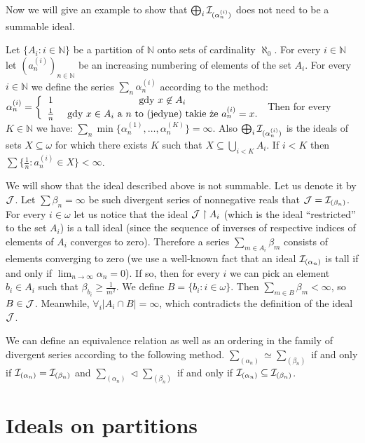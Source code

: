 \documentclass[12pt]{article}
\theoremstyle{plain}
\theoremstyle{definition}
\theoremstyle{remark}
\newcommand{\nnatural}{\mathbb{N}}
\newcommand{\cI}{{\cal I}}
\newcommand{\cJ}{{\cal J}}
\begin{document}
Now we will give an example to show that $\bigoplus_{i}\cI_{(\alpha_n^{(i)})}$ does not need to be a summable ideal.
	
Let $\{A_i\colon i\in\nnatural\}$ be a partition of $\nnatural$ onto sets of cardinality $\aleph_0$. For every $i\in\nnatural$ let $(a_n^{(i)})_{n\in\nnatural}$ be an increasing numbering of elements of the set $A_i$. For every $i\in\nnatural$ we define the series $\sum_n \alpha_n^{(i)}$ according to the method:
$\alpha_n^{(i)} = 
\left\{
\begin{array}{cc}
1 & \hbox{\ gdy\ } x \not\in A_i\\
\frac{1}{n} & \hbox{\ gdy\ } x \in A_i \hbox{{\ a\ }} n 
\hbox{{\ to\ (jedyne)\ takie\ że\ }} a_n^{(i)} = x.
\end{array}
\right.$
Then for every $K \in \nnatural$ we have: 
$\sum_n \min \{\alpha_n^{(1)}, \ldots, \alpha_n^{(K)}\} = \infty$.
Also $\bigoplus_{i}\cI_{(\alpha_n^{(i)})}$ is the ideals of sets $X \subseteq \omega$ for which there exists $K$ such that $X \subseteq \bigcup_{i < K} A_i$.
If $i < K$ then $\sum \{\frac{1}{n} \colon a_n^{(i)} \in X\} < \infty$.

We will show that the ideal described above is not summable. Let us denote it by $\cJ$. Let $\sum \beta_n = \infty$ be such divergent series of nonnegative reals that $\cJ = \cI_{(\beta_n)}$. For every $i \in \omega$ let us notice that the ideal $\cJ \restriction A_i$ (which is the ideal ``restricted'' to the set $A_i$) is a tall ideal (since the sequence of inverses of respective indices of elements of $A_i$ converges to zero). Therefore a series $\sum_{m\in A_i} \beta_m $ consists of elements converging to zero (we use a well-known fact that an ideal $\cI_{(\alpha_n)}$ is tall if and only if $\lim_{n\to\infty} \alpha_n = 0$). If so, then for every $i$ we can pick an element $b_i \in A_i$ such that $\beta_{b_i} \geq \frac{1}{m^2}$. We define $B = \lbrace {b_i\colon i\in\omega} \rbrace$. Then $\sum_{m\in B} \beta_m < \infty$, so $B \in \cJ$. Meanwhile, $\forall_{i} |A_i \cap B| = \infty$, which contradicts the definition of the ideal $\cJ$.

We can define an equivalence relation as well as an ordering in the family of divergent series according to the following method.
$\sum_{(\alpha_n)} \simeq \sum_{(\beta_n)}$ if and only if $\cI_{(\alpha_n)} = \cI_{(\beta_n)}$ and 
$\sum_{(\alpha_n)} \lhd \sum_{(\beta_n)}$ if and only if
$\cI_{(\alpha_n)} \subseteq \cI_{(\beta_n)}$.


\section{Ideals on partitions}
\end{document}
